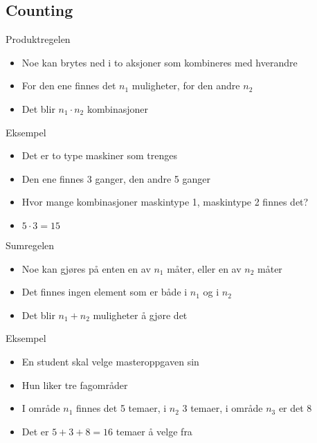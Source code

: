 \subsection{Counting}
\begin{frame}
\begin{block}{Produktregelen}
\begin{itemize}
\item Noe kan brytes ned i to aksjoner som kombineres med hverandre
\item For den ene finnes det $n_1$ muligheter, for den andre $n_2$
\item Det blir $n_1\cdot n_2$ kombinasjoner
\end{itemize}
\end{block}
\pause
\begin{block}{Eksempel}
\begin{itemize}
\item Det er to type maskiner som trenges
\item Den ene finnes 3 ganger, den andre 5 ganger
\item Hvor mange kombinasjoner maskintype 1, maskintype 2 finnes det?
\item $5\cdot 3=15$
\end{itemize}
\end{block}
\end{frame}

\begin{frame}
\begin{block}{Sumregelen}
\begin{itemize}
\item Noe kan gjøres på enten en av $n_1$ måter, eller en av $n_2$ måter
\item Det finnes ingen element som er både i $n_1$ og i $n_2$
\item Det blir $n_1+n_2$ muligheter å gjøre det
\end{itemize}
\end{block}
\pause
\begin{block}{Eksempel}
\begin{itemize}
\item En student skal velge masteroppgaven sin
\item Hun liker tre fagområder
\item I område $n_1$ finnes det 5 temaer, i $n_2$ 3 temaer, i område $n_3$ er det 8
\item Det er $5+3+8=16$ temaer å velge fra
\end{itemize}
\end{block}
\end{frame}

